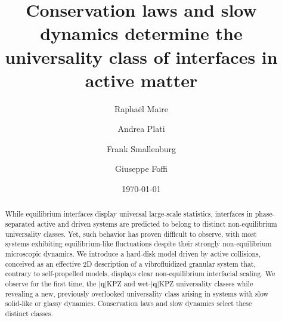 \documentclass[aps,
reprint,
superscriptaddress,









amsmath,amssymb,floatfix,






prl
]{revtex4-2}
\begin{document}
\title{Conservation laws and slow dynamics determine the universality class of interfaces in active matter}




\author{Raphaël Maire}
\author{Andrea Plati}
\author{ Frank Smallenburg}
\author{Giuseppe Foffi}

\date{\today}


\begin{abstract}
While equilibrium interfaces display universal large-scale statistics, interfaces in phase-separated active and driven systems are predicted to belong to distinct non-equilibrium universality classes. Yet, such behavior has proven difficult to observe, with most systems exhibiting equilibrium-like fluctuations despite their strongly non-equilibrium microscopic dynamics. We introduce a hard-disk model driven by active collisions, conceived as an effective 2D description of a vibrofluidized granular system that, contrary to self-propelled models, displays clear non-equilibrium interfacial scaling. We observe for the first time, the $|\boldsymbol q|$KPZ and wet-$|\boldsymbol q|$KPZ universality classes while revealing a new, previously overlooked universality class arising in systems with slow solid-like or glassy dynamics. Conservation laws and slow dynamics select these distinct classes.
\end{abstract}
\maketitle
\end{document}
